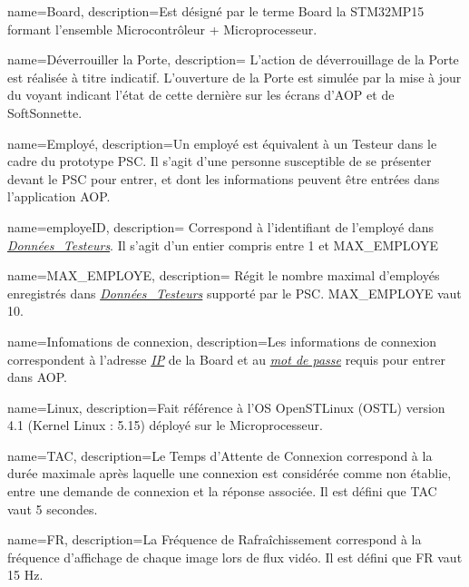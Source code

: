 {
    name={Board},
    description={\hypertarget{bd}{Est} désigné par le terme Board la STM32MP15 formant l'ensemble Microcontrôleur + Microprocesseur.}
}

{
    name={Déverrouiller la Porte},
    description={\hypertarget{deverrouiller}{} L'action de déverrouillage de la Porte est réalisée à titre indicatif. 
    L'ouverture de la Porte est simulée par la mise à jour du voyant indicant l'état de cette dernière sur les écrans d'AOP et de SoftSonnette.}
}

{
    name={Employé},
    description={\hypertarget{emp}{Un} employé est équivalent à un Testeur dans le cadre du prototype PSC.
    Il s'agit d'une personne susceptible de se présenter devant le PSC pour entrer, et dont les informations peuvent être entrées dans l'application AOP.}
}

{
    name={employeID},
    description={\hypertarget{idEmp}{} Correspond à l'identifiant de l'employé dans \hyperlink{donneesTesteurs}{\textit{Données\_Testeurs}}. 
    Il s'agit d'un entier compris entre 1 et MAX\_EMPLOYE}
}

{
    name={MAX\_EMPLOYE},
    description={\hypertarget{maxEmployee}{} Régit le nombre maximal d'employés enregistrés dans \hyperlink{donneesTesteurs}{\textit{Données\_Testeurs}} supporté par le PSC. 
    MAX\_EMPLOYE vaut 10.}
}

{
    name={Infomations de connexion},
    description={\hypertarget{idc}{Les} informations de connexion correspondent à l'adresse \hyperlink{IP}{\textit{IP}} de la Board et au \hyperlink{mdp}{\textit{mot de passe}} requis pour entrer dans AOP.}
}

{
    name={Linux},
    description={\hypertarget{linux}{}Fait référence à l'OS OpenSTLinux (OSTL) version 4.1 (Kernel Linux : 5.15) déployé sur le Microprocesseur.}
}

{
    name={TAC},
    description={\hypertarget{tac}{}Le Temps d'Attente de Connexion correspond à la durée maximale après laquelle une connexion est considérée comme non établie, entre une demande de connexion et la réponse associée. 
    Il est défini que TAC vaut 5 secondes.}
}

{
    name={FR},
    description={\hypertarget{fr}{}La Fréquence de Rafraîchissement correspond à la fréquence d'affichage de chaque image lors de flux vidéo. 
    Il est défini que FR vaut 15 Hz.}
}

